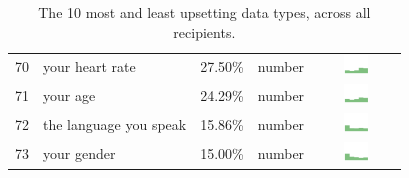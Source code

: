 \begin{table}[t]
\begin{center}
\begin{tabular}{| r | l | r | l |c |}
70 & your heart rate & 27.50\% & number & \includegraphics[width = 2cm, height = 0.5cm]{tex-inputs/data10/learnedyourheartratecombined} \\
71 & your age & 24.29\% & number & \includegraphics[width = 2cm, height = 0.5cm]{tex-inputs/data10/learnedyouragecombined}\\
72 & the language you speak & 15.86\% & number & \includegraphics[width = 2cm, height = 0.5cm]{tex-inputs/data10/learnedthelanguageyouwerespeakingcombined}\\
73 & your gender & 15.00\% & number & \includegraphics[width = 2cm, height = 0.5cm]{tex-inputs/data10/learnedyourgendercombined}\\ 
\hline
\end{tabular}
\caption{The 10 most and least upsetting data types, across all recipients.}
\label{top10}
\end{center}
\end{table}












